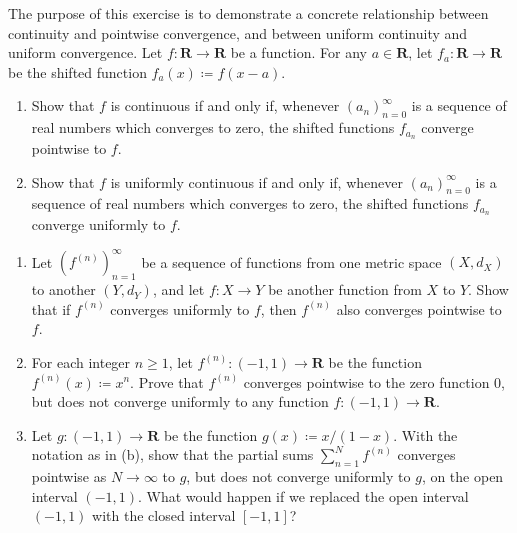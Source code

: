 \exercisesection

\begin{exercise}\label{ex 3.2.1}
    The purpose of this exercise is to demonstrate a concrete relationship between continuity and pointwise convergence, and between uniform continuity and uniform convergence.
    Let \(f : \mathbf{R} \to \mathbf{R}\) be a function.
    For any \(a \in \mathbf{R}\), let \(f_a : \mathbf{R} \to \mathbf{R}\) be the shifted function \(f_a(x) \coloneqq f(x - a)\).
    \begin{enumerate}
        \item Show that \(f\) is continuous if and only if, whenever \((a_n)_{n = 0}^\infty\) is a sequence of real numbers which converges to zero, the shifted functions \(f_{a_n}\) converge pointwise to \(f\).
        \item Show that \(f\) is uniformly continuous if and only if, whenever \((a_n)_{n = 0}^\infty\) is a sequence of real numbers which converges to zero, the shifted functions \(f_{a_n}\) converge uniformly to \(f\).
    \end{enumerate}
\end{exercise}

\begin{exercise}\label{ex 3.2.2}
    \mbox{}
    \begin{enumerate}
        \item Let \((f^{(n)})_{n = 1}^\infty\) be a sequence of functions from one metric space \((X, d_X)\) to another \((Y, d_Y)\), and let \(f : X \to Y\) be another function from \(X\) to \(Y\).
              Show that if \(f^{(n)}\) converges uniformly to \(f\), then \(f^{(n)}\) also converges pointwise to \(f\).
        \item For each integer \(n \geq 1\), let \(f^{(n)} : (-1, 1) \to \mathbf{R}\) be the function \(f^{(n)}(x) \coloneqq x^n\).
              Prove that \(f^{(n)}\) converges pointwise to the zero function \(0\), but does not converge uniformly to any function \(f : (-1, 1) \to \mathbf{R}\).
        \item Let \(g : (-1, 1) \to \mathbf{R}\) be the function \(g(x) \coloneqq x / (1 - x)\).
              With the notation as in (b), show that the partial sums \(\sum_{n = 1}^N f^{(n)}\) converges pointwise as \(N \to \infty\) to \(g\), but does not converge uniformly to \(g\), on the open interval \((-1, 1)\).
              What would happen if we replaced the open interval \((-1, 1)\) with the closed interval \([-1, 1]\)?
    \end{enumerate}
\end{exercise}

